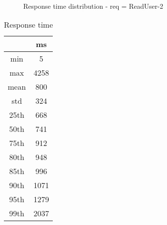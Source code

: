 \begin{minipage}{0.75\linewidth}
\begin{figure}[h]
\begin{adjustbox}{max width=1.0\linewidth, keepaspectratio}
  \end{adjustbox}
  \caption{Response time distribution - req = ReadUser-2}
\end{figure}
\end{minipage}\hfill\begin{minipage}{0.18\linewidth}
\begin{table}[h]
\begin{tabular}{|cc|}
\hline
\textbf{} & \textbf{ms}\\ \hline
 \Xhline{0.005\arrayrulewidth}
min & 5\\
 \Xhline{0.005\arrayrulewidth}
max & 4258\\
 \Xhline{0.005\arrayrulewidth}
mean & 800\\
 \Xhline{0.005\arrayrulewidth}
std & 324\\
\hline
\hline
 \Xhline{0.005\arrayrulewidth}
25th & 668\\
 \Xhline{0.005\arrayrulewidth}
50th & 741\\
 \Xhline{0.005\arrayrulewidth}
75th & 912\\
 \Xhline{0.005\arrayrulewidth}
80th & 948\\
 \Xhline{0.005\arrayrulewidth}
85th & 996\\
 \Xhline{0.005\arrayrulewidth}
90th & 1071\\
 \Xhline{0.005\arrayrulewidth}
95th & 1279\\
 \Xhline{0.005\arrayrulewidth}
99th & 2037\\
\hline
\end{tabular}
\caption{Response time}
\end{table}
\end{minipage}\hfill